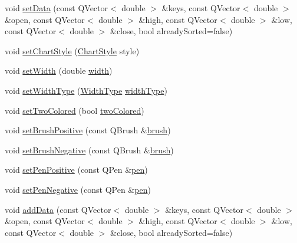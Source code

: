 \begin{DoxyCompactItemize}
\item 
void \hyperlink{class_q_c_p_financial_a12992e669ed19d7bb48dbe601570cc05}{set\+Data} (const Q\+Vector$<$ double $>$ \&keys, const Q\+Vector$<$ double $>$ \&open, const Q\+Vector$<$ double $>$ \&high, const Q\+Vector$<$ double $>$ \&low, const Q\+Vector$<$ double $>$ \&close, bool already\+Sorted=false)
\item 
void \hyperlink{class_q_c_p_financial_a5a59175d36279d71596e64d7bb65596f}{set\+Chart\+Style} (\hyperlink{class_q_c_p_financial_a0f800e21ee98d646dfc6f8f89d10ebfb}{Chart\+Style} style)
\item 
void \hyperlink{class_q_c_p_financial_a99633f8bac86a61d534ae5eeb1a3068f}{set\+Width} (double \hyperlink{class_q_c_p_financial_a12548f13658eda5833204ef60f524870}{width})
\item 
void \hyperlink{class_q_c_p_financial_a204b7b710352796593a432b723e34089}{set\+Width\+Type} (\hyperlink{class_q_c_p_financial_aef1761dda71a53dc5269685e9e492626}{Width\+Type} \hyperlink{class_q_c_p_financial_a7afa595e63800c072701e6e57d4ca9e2}{width\+Type})
\item 
void \hyperlink{class_q_c_p_financial_a138e44aac160a17a9676652e240c5f08}{set\+Two\+Colored} (bool \hyperlink{class_q_c_p_financial_afd4b51de5be8e53776b649f9877a50e6}{two\+Colored})
\item 
void \hyperlink{class_q_c_p_financial_a5ebff2b1764efd07cc44942e67821829}{set\+Brush\+Positive} (const Q\+Brush \&\hyperlink{class_q_c_p_abstract_plottable_a893b4896dfd92b68b05b2600b80f5826}{brush})
\item 
void \hyperlink{class_q_c_p_financial_a8bbdd87629f9144b3ef51af660c0961a}{set\+Brush\+Negative} (const Q\+Brush \&\hyperlink{class_q_c_p_abstract_plottable_a893b4896dfd92b68b05b2600b80f5826}{brush})
\item 
void \hyperlink{class_q_c_p_financial_ac58aa3adc7a35aab0088764b840683e5}{set\+Pen\+Positive} (const Q\+Pen \&\hyperlink{class_q_c_p_abstract_plottable_ad5972efc31344e5a7a78ab4f8864b2d3}{pen})
\item 
void \hyperlink{class_q_c_p_financial_afe5c07e94ccea01a75b3a2476993c346}{set\+Pen\+Negative} (const Q\+Pen \&\hyperlink{class_q_c_p_abstract_plottable_ad5972efc31344e5a7a78ab4f8864b2d3}{pen})
\item 
void \hyperlink{class_q_c_p_financial_a372ac031e44a7a6c912d203556af96f7}{add\+Data} (const Q\+Vector$<$ double $>$ \&keys, const Q\+Vector$<$ double $>$ \&open, const Q\+Vector$<$ double $>$ \&high, const Q\+Vector$<$ double $>$ \&low, const Q\+Vector$<$ double $>$ \&close, bool already\+Sorted=false)

\end{DoxyCompactItemize}
